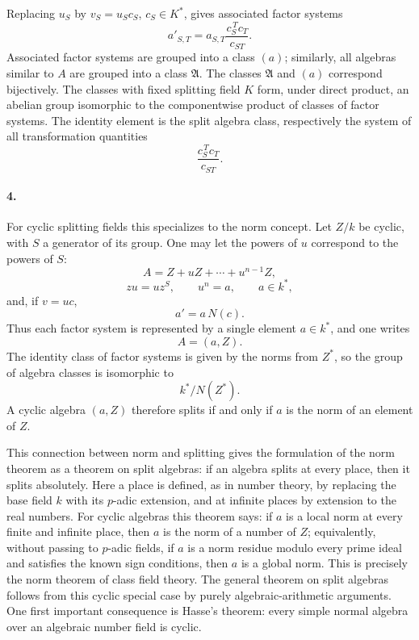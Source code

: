 \documentclass[11pt]{article}
\begin{document}
Replacing \(u_S\) by \(v_S=u_Sc_S\), \(c_S\in K^*\), gives associated factor systems
\[
        a'_{S,T}=a_{S,T}\frac{c_S^{\,T}c_T}{c_{ST}}.
\]
Associated factor systems are grouped into a class \((a)\); similarly, all algebras similar to \(A\) are grouped into a class \(\mathfrak A\). The classes \(\mathfrak A\) and \((a)\) correspond bijectively. The classes with fixed splitting field \(K\) form, under direct product, an abelian group isomorphic to the componentwise product of classes of factor systems. The identity element is the split algebra class, respectively the system of all transformation quantities
\[
        \frac{c_S^{\,T}c_T}{c_{ST}}.
\]

\paragraph{4.}
For cyclic splitting fields this specializes to the norm concept. Let \(Z/k\) be cyclic, with \(S\) a generator of its group. One may let the powers of \(u\) correspond to the powers of \(S\):
\[
        A=Z+uZ+\cdots+u^{n-1}Z,
\]
\[
        zu=uz^S,\qquad u^n=a,\qquad a\in k^*,
\]
and, if \(v=uc\),
\[
        a'=a\,N(c).
\]
Thus each factor system is represented by a single element \(a\in k^*\), and one writes
\[
        A=(a,Z).
\]
The identity class of factor systems is given by the norms from \(Z^*\), so the group of algebra classes is isomorphic to
\[
        k^*/N(Z^*).
\]
A cyclic algebra \((a,Z)\) therefore splits if and only if \(a\) is the norm of an element of \(Z\).

This connection between norm and splitting gives the formulation of the norm theorem as a theorem on split algebras: if an algebra splits at every place, then it splits absolutely. Here a place is defined, as in number theory, by replacing the base field \(k\) with its \(p\)-adic extension, and at infinite places by extension to the real numbers. For cyclic algebras this theorem says: if \(a\) is a local norm at every finite and infinite place, then \(a\) is the norm of a number of \(Z\); equivalently, without passing to \(p\)-adic fields, if \(a\) is a norm residue modulo every prime ideal and satisfies the known sign conditions, then \(a\) is a global norm. This is precisely the norm theorem of class field theory. The general theorem on split algebras follows from this cyclic special case by purely algebraic-arithmetic arguments. One first important consequence is Hasse's theorem: every simple normal algebra over an algebraic number field is cyclic.
\end{document}
